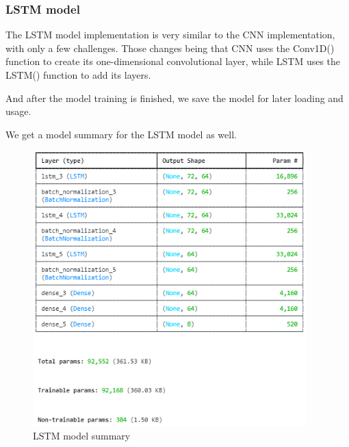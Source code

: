 





\subsubsection{LSTM model}
The LSTM model implementation is very similar to the CNN implementation, with only a few challenges. Those changes being that CNN uses the Conv1D() function to create its one-dimensional convolutional layer, while LSTM uses the LSTM() function to add its layers.


And after the model training is finished, we save the model for later loading and usage.

\newpage

We get a model summary for the LSTM model as well.

\begin{figure}[h]
	\centering
	\includegraphics[width=400px]{figures/LSTM_model_summary.png}
	\caption{LSTM model summary}
	\label{fig:test}
\end{figure}


